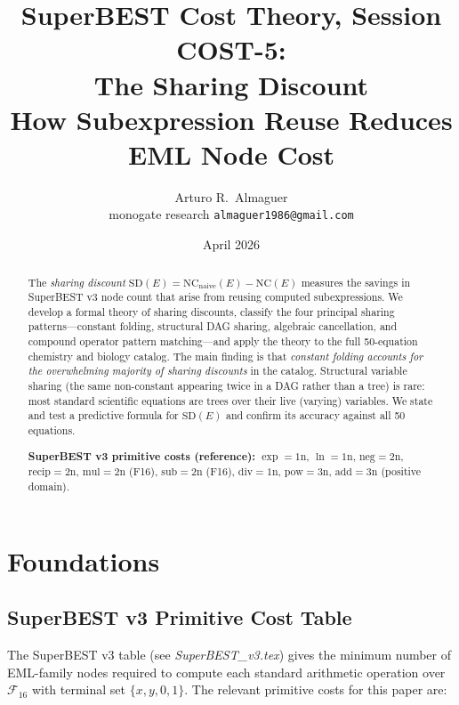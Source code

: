 \documentclass[12pt,a4paper]{article}
\title{SuperBEST Cost Theory, Session COST-5:\\
       The Sharing Discount\\[6pt]
       \large How Subexpression Reuse Reduces EML Node Cost}
\author{Arturo R.\ Almaguer\\
\small monogate research \quad \texttt{almaguer1986@gmail.com}}
\date{April 2026}
\theoremstyle{definition}
\newcommand{\NC}{\mathrm{NC}}
\newcommand{\SD}{\mathrm{SD}}
\begin{document}
\maketitle

\begin{abstract}
The \emph{sharing discount} $\SD(E) = \NC_{\mathrm{naive}}(E) - \NC(E)$
measures the savings in SuperBEST v3 node count that arise from reusing
computed subexpressions.  We develop a formal theory of sharing discounts,
classify the four principal sharing patterns---constant folding, structural
DAG sharing, algebraic cancellation, and compound operator pattern
matching---and apply the theory to the full 50-equation chemistry and
biology catalog.  The main finding is that \emph{constant folding accounts
for the overwhelming majority of sharing discounts} in the catalog.
Structural variable sharing (the same non-constant appearing twice in a DAG
rather than a tree) is rare: most standard scientific equations are trees over
their live (varying) variables.  We state and test a predictive formula for
$\SD(E)$ and confirm its accuracy against all 50 equations.

\medskip
\noindent\textbf{SuperBEST v3 primitive costs (reference):}
$\exp = 1\mathrm{n}$, $\ln = 1\mathrm{n}$, $\mathrm{neg} = 2\mathrm{n}$,
$\mathrm{recip} = 2\mathrm{n}$, $\mathrm{mul} = 2\mathrm{n}$ (F16),
$\mathrm{sub} = 2\mathrm{n}$ (F16), $\mathrm{div} = 1\mathrm{n}$,
$\mathrm{pow} = 3\mathrm{n}$, $\mathrm{add} = 3\mathrm{n}$ (positive
domain).
\end{abstract}

\tableofcontents
\newpage

\section{Foundations}
\label{sec:foundations}

\subsection{SuperBEST v3 Primitive Cost Table}

The SuperBEST v3 table (see \textit{SuperBEST\_v3.tex}) gives the minimum
number of EML-family nodes required to compute each standard arithmetic
operation over $\mathcal{F}_{16}$ with terminal set $\{x, y, 0, 1\}$.
The relevant primitive costs for this paper are:
\end{document}
